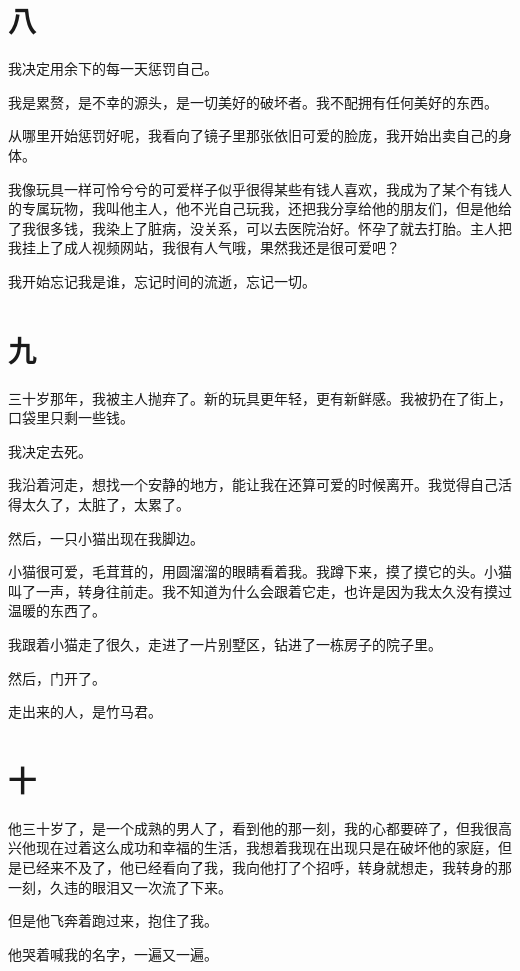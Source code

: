 \documentclass[12pt, a4paper]{ctexart}
\begin{document}
\section*{八}

我决定用余下的每一天惩罚自己。

我是累赘，是不幸的源头，是一切美好的破坏者。我不配拥有任何美好的东西。

从哪里开始惩罚好呢，我看向了镜子里那张依旧可爱的脸庞，我开始出卖自己的身体。

我像玩具一样可怜兮兮的可爱样子似乎很得某些有钱人喜欢，我成为了某个有钱人的专属玩物，我叫他主人，他不光自己玩我，还把我分享给他的朋友们，但是他给了我很多钱，我染上了脏病，没关系，可以去医院治好。怀孕了就去打胎。主人把我挂上了成人视频网站，我很有人气哦，果然我还是很可爱吧？

我开始忘记我是谁，忘记时间的流逝，忘记一切。

\section*{九}

三十岁那年，我被主人抛弃了。新的玩具更年轻，更有新鲜感。我被扔在了街上，口袋里只剩一些钱。

我决定去死。

我沿着河走，想找一个安静的地方，能让我在还算可爱的时候离开。我觉得自己活得太久了，太脏了，太累了。

然后，一只小猫出现在我脚边。

小猫很可爱，毛茸茸的，用圆溜溜的眼睛看着我。我蹲下来，摸了摸它的头。小猫叫了一声，转身往前走。我不知道为什么会跟着它走，也许是因为我太久没有摸过温暖的东西了。

我跟着小猫走了很久，走进了一片别墅区，钻进了一栋房子的院子里。

然后，门开了。

走出来的人，是竹马君。

\section*{十}

他三十岁了，是一个成熟的男人了，看到他的那一刻，我的心都要碎了，但我很高兴他现在过着这么成功和幸福的生活，我想着我现在出现只是在破坏他的家庭，但是已经来不及了，他已经看向了我，我向他打了个招呼，转身就想走，我转身的那一刻，久违的眼泪又一次流了下来。

但是他飞奔着跑过来，抱住了我。

他哭着喊我的名字，一遍又一遍。
\end{document}
